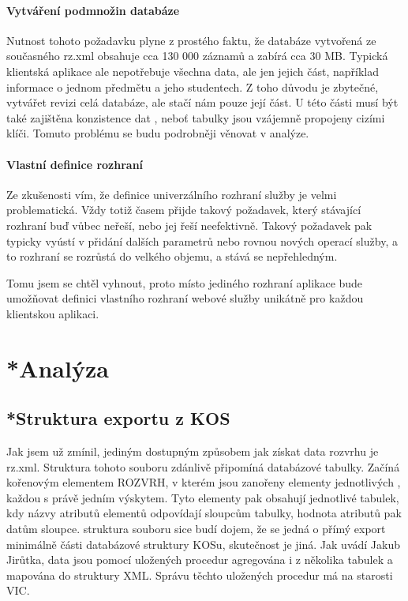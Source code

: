 \documentclass[11pt,twoside,a4paper]{book}
\begin{document}
\subsubsection{Vytváření podmnožin databáze}
Nutnost tohoto požadavku plyne z prostého faktu, že databáze vytvořená ze současného rz.xml obsahuje cca 130 000 záznamů a zabírá cca 30 MB. Typická klientská aplikace ale nepotřebuje všechna data, ale jen jejich část, například informace o jednom předmětu a jeho studentech. Z toho důvodu je zbytečné, vytvářet revizi celá databáze, ale stačí nám pouze její část. U této části musí být také zajištěna konzistence dat , neboť tabulky jsou vzájemně propojeny cizími klíči. Tomuto problému se budu podrobněji věnovat v analýze.

\subsubsection{Vlastní definice rozhraní}
Ze zkušenosti vím, že definice univerzálního rozhraní služby je velmi problematická. Vždy totiž časem přijde takový požadavek, který stávající rozhraní buď vůbec neřeší, nebo jej řeší neefektivně. Takový požadavek pak typicky vyústí v přidání dalších parametrů nebo rovnou nových operací služby, a to  rozhraní se rozrůstá do velkého objemu, a stává se nepřehledným.

Tomu jsem se chtěl vyhnout, proto místo jediného rozhraní aplikace bude umožňovat definici vlastního rozhraní webové služby unikátně pro každou klientskou aplikaci.


\chapter{*Analýza}



\section{*Struktura exportu z KOS}
Jak jsem už zmínil, jediným dostupným způsobem jak získat data rozvrhu je rz.xml. Struktura tohoto souboru zdánlivě připomíná databázové tabulky. Začíná kořenovým elementem ROZVRH, v kterém jsou zanořeny elementy jednotlivých , každou s právě jedním výskytem. Tyto elementy pak obsahují jednotlivé  tabulek, kdy názvy atributů elementů odpovídají sloupcům tabulky, hodnota atributů pak datům sloupce. struktura souboru sice budí dojem, že se jedná o přímý export minimálně části databázové struktury KOSu, skutečnost je jiná. Jak uvádí Jakub Jirůtka\cite{jirutka}, data jsou pomocí uložených procedur agregována i z několika tabulek a mapována do struktury XML. Správu těchto uložených procedur má na starosti VIC.
\end{document}
